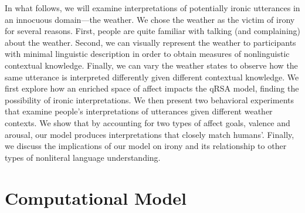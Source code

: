 \documentclass[10pt,letterpaper]{article}
\begin{document}




In what follows, we will examine interpretations of potentially ironic utterances in an innocuous domain---the weather. We chose the weather as the victim of irony for several reasons. First, people are quite familiar with talking (and complaining) about the weather. Second, we can visually represent the weather to participants with minimal linguistic description in order to obtain measures of nonlinguistic contextual knowledge. Finally, we can vary the weather states to observe how the same utterance is interpreted differently given different contextual knowledge. We first explore how an enriched space of affect impacts the qRSA model, finding the possibility of ironic interpretations. We then present two behavioral experiments that examine people's interpretations of utterances given different weather contexts. We show that by accounting for two types of affect goals, valence and arousal, our model produces interpretations that closely match humans'. Finally, we discuss the implications of our model on irony and its relationship to other types of nonliteral language understanding.

\section{Computational Model}
\end{document}
